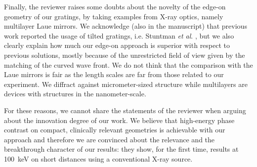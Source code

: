 \documentclass[a4paper,english]{scrartcl}
\begin{document}
Finally, the reviewer raises some doubts about the novelty of the edge-on geometry of our
gratings, by taking examples from
X-ray optics, namely multilayer Laue mirrors. We acknowledge
(also in the manuscript) that previous work reported the usage of tilted
gratings, i.e. Stuntman \emph{et al}.
, but we also clearly explain
 how much our edge-on approach is superior with
respect to previous solutions, mostly because of the unrestricted field of
view given by the matching of the curved wave front. We do not think that the comparison with the Laue
mirrors is fair as the length scales are far from those
related to our experiment. We diffract against micrometer-sized structure
while multilayers are devices with structures in the nanometer-scale.

For these reasons, we cannot share the statements of the reviewer when arguing
about the innovation degree of our work. We believe that high-energy phase
contrast on compact, clinically relevant geometries is achievable with our
approach and therefore we are convinced about the relevance and the
breakthrough character of our results: they show, for the first time,
results at \SI{100}{\kilo\eV} on short distances using a conventional X-ray source.
\end{document}
